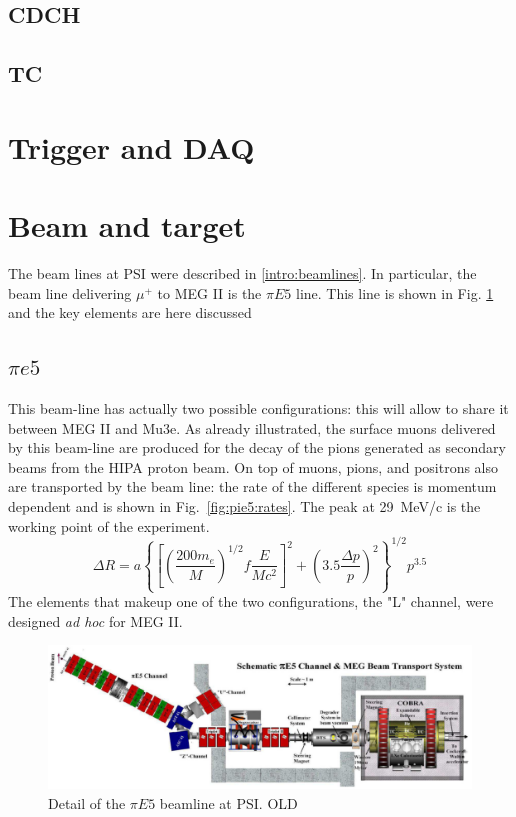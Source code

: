 \begin{refsection}
    \subsection{CDCH}
    \subsection{TC}

\section{Trigger and DAQ}

\section{Beam and target}
    The beam lines at PSI were described in \ref{intro:beamlines}. 
    In particular, the beam line delivering $\mu^+$ to MEG II is the $\pi E5$ line. 
    This line is shown in  Fig. \ref{fig:pie5} and the key elements are here discussed

    \subsection{$\pi e5$}
        This beam-line has actually two possible configurations: this will allow to share it between MEG II and Mu3e. 
        As already illustrated, the surface muons delivered by this beam-line are produced for the decay of the pions generated as secondary beams from the HIPA proton beam.
        On top of muons, pions, and positrons also are transported by the beam line: the rate of the different species is momentum dependent and is shown in Fig.~\ref{fig:pie5:rates}.
        The peak at \SI{29}{MeV/c} is the working point of the experiment.
        \begin{equation}
            \Delta R = a \left\{
                \left[  
                    \left( \frac{200 m_e}{M}\right)^{1/2} f \frac{E}{Mc^2}
                \right]^2 + 
                \left( 3.5\frac{\Delta p }{p}\right)^2
            \right\} ^{1/2} p^{3.5}
        \end{equation}
        The elements that makeup one of the two configurations, the "L" channel, were designed \textit{ad hoc} for MEG II.

        \begin{figure}
            \centering
            \includegraphics[width = \textwidth]{Figures/MEG/pie5_beamline.png}
            \caption{Detail of the $\pi E5$ beamline at PSI. OLD}
            \label{fig:pie5}
        \end{figure}


\end{refsection}
